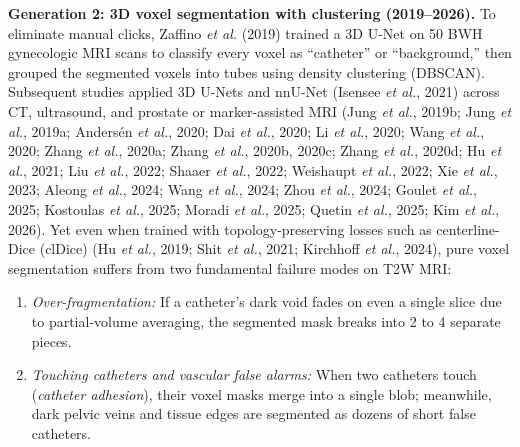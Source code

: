 \documentclass[
  11pt,
]{article}
\providecommand{\tightlist}{%
  \setlength{\itemsep}{0pt}\setlength{\parskip}{0pt}}
\begin{document}
\textbf{Generation 2: 3D voxel segmentation with clustering
(2019--2026).} To eliminate manual clicks, Zaffino \emph{et al.} (2019)
trained a 3D U-Net on 50 BWH gynecologic MRI scans to classify every
voxel as ``catheter'' or ``background,'' then grouped the segmented
voxels into tubes using density clustering (DBSCAN). Subsequent studies
applied 3D U-Nets and nnU-Net (Isensee \emph{et al.}, 2021) across CT,
ultrasound, and prostate or marker-assisted MRI (Jung \emph{et al.},
2019b; Jung \emph{et al.}, 2019a; Andersén \emph{et al.}, 2020; Dai
\emph{et al.}, 2020; Li \emph{et al.}, 2020; Wang \emph{et al.}, 2020;
Zhang \emph{et al.}, 2020a; Zhang \emph{et al.}, 2020b, 2020c; Zhang
\emph{et al.}, 2020d; Hu \emph{et al.}, 2021; Liu \emph{et al.}, 2022;
Shaaer \emph{et al.}, 2022; Weishaupt \emph{et al.}, 2022; Xie \emph{et
al.}, 2023; Aleong \emph{et al.}, 2024; Wang \emph{et al.}, 2024; Zhou
\emph{et al.}, 2024; Goulet \emph{et al.}, 2025; Kostoulas \emph{et
al.}, 2025; Moradi \emph{et al.}, 2025; Quetin \emph{et al.}, 2025; Kim
\emph{et al.}, 2026). Yet even when trained with topology-preserving
losses such as centerline-Dice (clDice) (Hu \emph{et al.}, 2019; Shit
\emph{et al.}, 2021; Kirchhoff \emph{et al.}, 2024), pure voxel
segmentation suffers from two fundamental failure modes on T2W MRI:

\begin{enumerate}
\def\labelenumi{\arabic{enumi}.}
\tightlist
\item
  \emph{Over-fragmentation:} If a catheter's dark void fades on even a
  single slice due to partial-volume averaging, the segmented mask
  breaks into 2 to 4 separate pieces.
\item
  \emph{Touching catheters and vascular false alarms:} When two
  catheters touch (\emph{catheter adhesion}), their voxel masks merge
  into a single blob; meanwhile, dark pelvic veins and tissue edges are
  segmented as dozens of short false catheters.
\end{enumerate}
\end{document}
